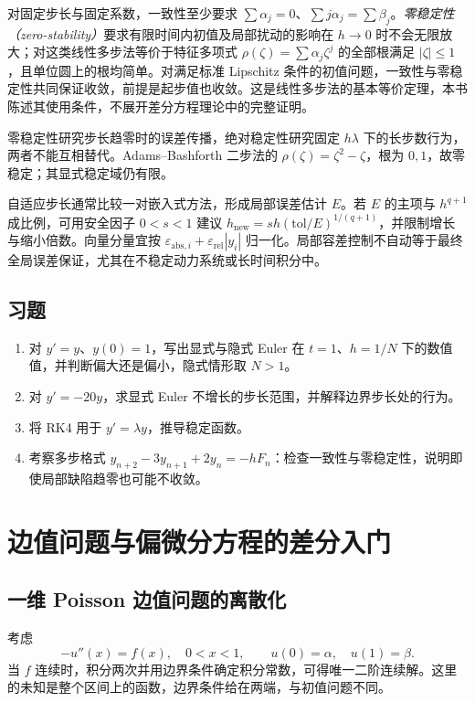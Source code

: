 \documentclass[UTF8,12pt,a4paper,fontset=fandol]{ctexbook}
\begin{document}
对固定步长与固定系数，一致性至少要求 $\sum\alpha_j=0$、$\sum j\alpha_j=\sum\beta_j$。\emph{零稳定性（zero-stability）}要求有限时间内初值及局部扰动的影响在 $h\to0$ 时不会无限放大；对这类线性多步法等价于特征多项式 $\rho(\zeta)=\sum\alpha_j\zeta^j$ 的全部根满足 $|\zeta|\le1$，且单位圆上的根均简单。对满足标准 Lipschitz 条件的初值问题，一致性与零稳定性共同保证收敛，前提是起步值也收敛。这是线性多步法的基本等价定理，本书陈述其使用条件，不展开差分方程理论中的完整证明。

零稳定性研究步长趋零时的误差传播，绝对稳定性研究固定 $h\lambda$ 下的长步数行为，两者不能互相替代。Adams--Bashforth 二步法的 $\rho(\zeta)=\zeta^2-\zeta$，根为 $0,1$，故零稳定；其显式稳定域仍有限。

自适应步长通常比较一对嵌入式方法，形成局部误差估计 $E$。若 $E$ 的主项与 $h^{q+1}$ 成比例，可用安全因子 $0<s<1$ 建议 $h_{\mathrm{new}}=sh(\mathrm{tol}/E)^{1/(q+1)}$，并限制增长与缩小倍数。向量分量宜按 $\varepsilon_{\mathrm{abs},i}+\varepsilon_{\mathrm{rel}}|y_i|$ 归一化。局部容差控制不自动等于最终全局误差保证，尤其在不稳定动力系统或长时间积分中。

\section{习题}
\begin{enumerate}[label=\arabic*.]
\item\label{exr:na-ode-euler} 对 $y'=y$、$y(0)=1$，写出显式与隐式 Euler 在 $t=1$、$h=1/N$ 下的数值值，并判断偏大还是偏小，隐式情形取 $N>1$。
\item\label{exr:na-ode-stability} 对 $y'=-20y$，求显式 Euler 不增长的步长范围，并解释边界步长处的行为。
\item\label{exr:na-ode-rk} 将 RK4 用于 $y'=\lambda y$，推导稳定函数。
\item\label{exr:na-ode-root} 考察多步格式 $y_{n+2}-3y_{n+1}+2y_n=-hF_n$：检查一致性与零稳定性，说明即使局部缺陷趋零也可能不收敛。
\end{enumerate}

\chapter{边值问题与偏微分方程的差分入门}
\label{chap:na-pde}

\section{一维 Poisson 边值问题的离散化}
考虑
\begin{equation}
 -u''(x)=f(x),\quad 0<x<1,\qquad u(0)=\alpha,\quad u(1)=\beta.
 \label{eq:na-poisson}
\end{equation}
当 $f$ 连续时，积分两次并用边界条件确定积分常数，可得唯一二阶连续解。这里的未知是整个区间上的函数，边界条件给在两端，与初值问题不同。
\end{document}
